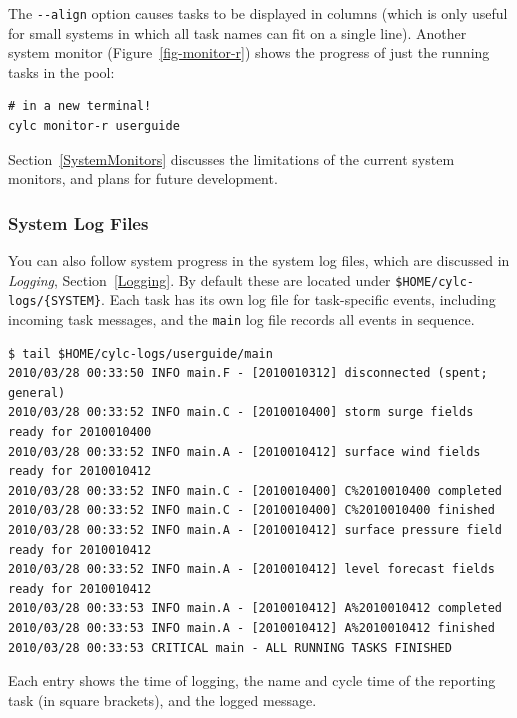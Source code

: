 \documentclass[11pt,a4paper]{article}
\begin{document}
The \lstinline=--align= option causes tasks to be displayed in columns
(which is only useful for small systems in which all task names can fit
on a single line).  Another system monitor (Figure~\ref{fig-monitor-r})
shows the progress of just the running tasks in the pool:

\begin{lstlisting}
# in a new terminal!
cylc monitor-r userguide
\end{lstlisting}

Section~\ref{SystemMonitors} discusses the limitations of the
current system monitors, and plans for future development.

\subsubsection{System Log Files}
\label{QuickSystemLogFiles}

You can also follow system progress in the system log files, which are
discussed in {\em Logging}, Section~\ref{Logging}. By
default these are located under \lstinline=$HOME/cylc-logs/{SYSTEM}=.
Each task has its own log file for task-specific events, including 
incoming task messages, and the \lstinline=main= log file records all
events in sequence.

\begin{lstlisting}
$ tail $HOME/cylc-logs/userguide/main
2010/03/28 00:33:50 INFO main.F - [2010010312] disconnected (spent; general)
2010/03/28 00:33:52 INFO main.C - [2010010400] storm surge fields ready for 2010010400
2010/03/28 00:33:52 INFO main.A - [2010010412] surface wind fields ready for 2010010412
2010/03/28 00:33:52 INFO main.C - [2010010400] C%2010010400 completed
2010/03/28 00:33:52 INFO main.C - [2010010400] C%2010010400 finished
2010/03/28 00:33:52 INFO main.A - [2010010412] surface pressure field ready for 2010010412
2010/03/28 00:33:52 INFO main.A - [2010010412] level forecast fields ready for 2010010412
2010/03/28 00:33:53 INFO main.A - [2010010412] A%2010010412 completed
2010/03/28 00:33:53 INFO main.A - [2010010412] A%2010010412 finished
2010/03/28 00:33:53 CRITICAL main - ALL RUNNING TASKS FINISHED
\end{lstlisting}


Each entry shows the time of logging, the name and cycle time of the
reporting task (in square brackets), and the logged message.
\end{document}
